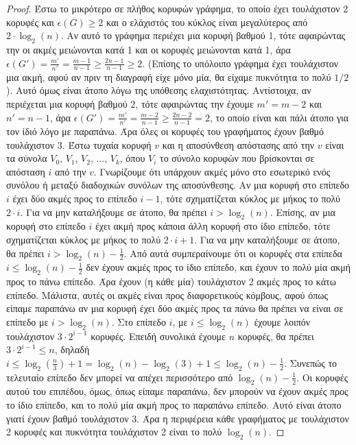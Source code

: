 \documentclass[a4paper, oneside, 11pt]{article}
\theoremstyle{definition}
\begin{document}
\begin{enumerate}
   \begin{proof}
Έστω το μικρότερο σε πλήθος κορυφών γράφημα, το οποίο έχει τουλάχιστον 2 κορυφές και $\epsilon(G) \geq 2$ και ο ελάχιστός του κύκλος είναι μεγαλύτερος από $2\cdot \log_2 (n)$. Αν αυτό το γράφημα περιέχει
μια κορυφή βαθμού 1, τότε αφαιρώντας την οι ακμές μειώνονται κατά 1 και οι κορυφές μειώνονται κατά 1, άρα $\epsilon (G') = \frac{m'}{n'}=\frac{m-1}{n-1}\geq \frac{2n-1}{n-1}\geq 2$. (Επίσης το υπόλοιπο
γράφημα έχει τουλάχιστον μια ακμή, αφού αν πριν τη διαγραφή είχε μόνο μία, θα είχαμε πυκνότητα το πολύ $1/2$). Αυτό όμως είναι άτοπο λόγω της υπόθεσης ελαχιστότητας. Αντίστοιχα, αν περιέχεται μια κορυφή
βαθμού 2, τότε αφαιρώντας την έχουμε $m'=m-2$ και $n'=n-1$, άρα $\epsilon(G')=\frac{m'}{n'}=\frac{m-2}{n-1}\geq \frac{2n-2}{n-1}=2$, το οποίο είναι και πάλι άτοπο για τον ίδιό λόγο με παραπάνω. Άρα όλες
οι κορυφές του γραφήματος έχουν βαθμό τουλάχιστον 3. Έστω τυχαία κορυφή $v$ και η αποσύνθεση απόστασης από την $v$ είναι τα σύνολα $V_0$, $V_1$, $V_2$, ..., $V_k$, όπου $V_i$ το σύνολο κορυφών που 
βρίσκονται σε
απόσταση $i$ από την $v$. Γνωρίζουμε ότι υπάρχουν ακμές μόνο στο εσωτερικό
ενός συνόλου ή μεταξύ διαδοχικών συνόλων της αποσύνθεσης. Αν μια κορυφή στο επίπεδο $i$ έχει δύο ακμές προς το επίπεδο $i-1$, τότε σχηματίζεται
κύκλος με μήκος το πολύ $2\cdot i$. Για να μην καταλήξουμε σε άτοπο, θα πρέπει $i>\log_2 (n)$. Επίσης, αν μια κορυφή στο επίπεδο $i$ έχει ακμή προς κάποια άλλη κορυφή στο ίδιο επίπεδο, τότε σχηματίζεται
κύκλος με μήκος το πολύ $2\cdot i + 1$. Για να μην καταλήξουμε σε άτοπο, θα πρέπει $i>\log_2 (n) - \frac{1}{2}$. 
Από αυτά συμπεραίνουμε ότι οι κορυφές στα επίπεδα $i \leq \log_2 (n) - \frac{1}{2}$ δεν έχουν ακμές προς το ίδιο επίπεδο, και έχουν το πολύ μία ακμή προς το πάνω επίπεδο. 
Άρα έχουν (η κάθε μία) τουλάχιστον 2 ακμές προς το κάτω επίπεδο. Μάλιστα, αυτές οι ακμές είναι προς διαφορετικούς κόμβους, αφού όπως είπαμε
παραπάνω αν μια κορυφή έχει δύο ακμές προς τα πάνω θα πρέπει να είναι σε επίπεδο με $i>\log_2 (n)$. Στο επίπεδο $i$, με $i\leq\log_2 (n)$ έχουμε λοιπόν τουλάχιστον $3\cdot 2^{i-1}$ κορυφές. Επειδή συνολικά
έχουμε $n$ κορυφές, θα πρέπει $3\cdot 2^{i-1} \leq n$, δηλαδή $i \leq \log_2 (\frac{n}{3}) + 1 = \log_2 (n) - \log_2 (3) + 1 \leq \log_2 (n) - \frac{1}{2}$. Συνεπώς το τελευταίο επίπεδο δεν μπορεί να
απέχει περισσότερο από $\log_2 (n) - \frac{1}{2}$. Οι κορυφές αυτού του επιπέδου, όμως, όπως είπαμε παραπάνω, δεν μπορούν να έχουν ακμές προς το ίδιο επίπεδο, και το πολύ μία ακμή προς το παραπάνω επίπεδο.
Αυτό είναι άτοπο γιατί έχουν βαθμό τουλάχιστον 3. Άρα η περιφέρεια κάθε γραφήματος με τουλάχιστον 2 κορυφές και πυκνότητα τουλάχιστον 2 είναι το πολύ $\log_2 (n)$.
   \end{proof}
\end{enumerate}
\end{document}
